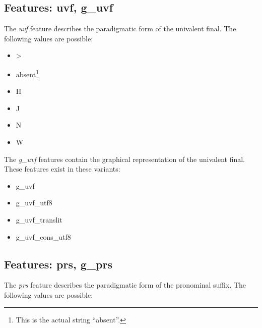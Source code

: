 \documentclass[11pt,oneside,a4paper]{memoir}
\begin{document}
\subsection{Features: uvf, g\_uvf}

The \emph{uvf} feature describes the paradigmatic form of the univalent final. The following
values are possible:

\begin{itemize}
\item >
\item absent\footnote{This is the actual string ``absent''.}
\item H
\item J
\item N
\item W
\end{itemize}

The \emph{g\_uvf} features contain the graphical representation of the univalent final.
These features exist in these variants:

\begin{itemize}
\item g\_uvf
\item g\_uvf\_utf8
\item g\_uvf\_translit
\item g\_uvf\_cons\_utf8
\end{itemize}


\subsection{Features: prs, g\_prs}\label{prs}

The \emph{prs} feature describes the paradigmatic form of the pronominal suffix. The following
values are possible:

\tabulinesep=0mm %
\end{document}
